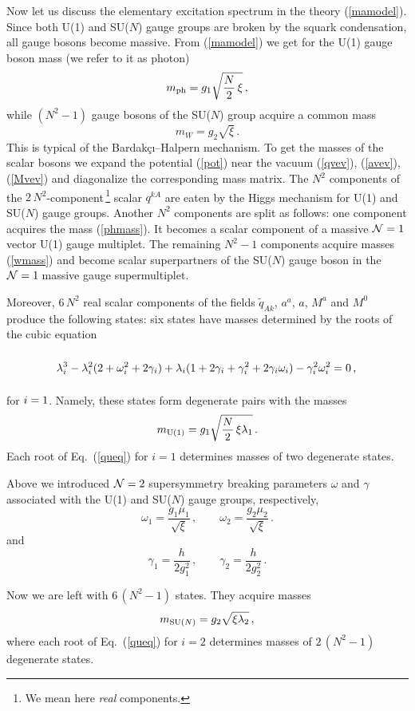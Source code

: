 \documentclass[epsfig,12pt]{article}
\def\beq{\begin{equation}}
\def\eeq{\end{equation}}
\newcommand{\ntwo}{${\cal N}=2\;$}
\newcommand{\none}{${\cal N}=1\;$}
\begin{document}
Now let us discuss the elementary excitation 
spectrum in the theory (\ref{mamodel}). Since
both U(1) and SU($N$) gauge groups are broken by the squark condensation,
all gauge bosons become massive. From (\ref{mamodel}) we get for the U(1)
gauge boson mass (we refer to it as photon)
\beq
m_{\rm ph}=g_1\sqrt{\frac{N}{2}\,\xi}\,,
\label{phmass}
\eeq
while   $(N^2-1)$ gauge bosons of the SU($N$) group acquire a common mass
\beq
m_{W}=g_2\sqrt{\xi}\,.
\label{wmass}
\eeq
This is typical of the Bardak\c{c}\i--Halpern mechanism.
To get the masses of the scalar bosons we expand the potential (\ref{pot})
near the vacuum (\ref{qvev}), (\ref{avev}), (\ref{Mvev}) and diagonalize the
corresponding mass matrix. The $N^2$ components of the
$2\,N^2$-component\,\footnote{We mean here  {\em real} components.}
scalar $q^{kA}$
are eaten by the Higgs mechanism for U(1) and SU($N$)
gauge groups. Another $N^2$ components are split as follows:
one component acquires the mass (\ref{phmass}). It becomes
 a scalar component of  a massive \none vector U(1) gauge multiplet.
The remaining $N^2-1$ components acquire masses (\ref{wmass}) and become
scalar superpartners of the SU($N$) gauge boson in the \none massive gauge
supermultiplet.

\vspace{2mm}

Moreover,  6$\,N^2$ real scalar components of the fields $\tilde{q}_{Ak}$, $a^a$, $a$,
$M^a$ and  $M^0$ produce the following states: 
six states have masses determined by the roots of the  cubic equation
\beq
\lambda_i^3-\lambda_i^2(2+\omega^2_i +2\gamma_i) +
\lambda_i(1 +2\gamma_i+\gamma^2_i +2\gamma_i\omega_i) -\gamma_i^2\omega_i^2=0\,,
\rule{0mm}{7mm}
\label{queq}
\eeq
for $i=1\rule{0mm}{7mm}$. Namely, these states form degenerate 
pairs with the masses 
\beq
m_{{\rm U}(1)}=g_1\sqrt{\frac{N}{2}\,\xi\lambda_1}\,.
\label{u1m}
\eeq
Each root of Eq.~(\ref{queq}) for $i=1$ determines masses
of two degenerate states.

Above we introduced  \ntwo supersymmetry breaking
parameters $\omega $ and $\gamma$
associated with the  U(1) and SU($N$) gauge groups, respectively,
\beq
\omega_1=\frac{g_1\mu_1}{\sqrt{\xi}}\, ,\qquad
\omega_2=\frac{g_2\mu_2}{\sqrt{\xi}}\,.
\label{omega}
\eeq
and 
\beq
\gamma_1=\frac{h}{2g^2_1}\, ,\qquad
\gamma_2=\frac{h}{2g^2_2}\,.
\label{gamma}
\eeq
\mbox{}
\vspace{2mm}
\mbox{}

Now we are left with $6\,(N^2-1)$ states.
They acquire masses
\beq
m_{{\rm SU}(N)}=g_2\sqrt{\xi\lambda_2}\,,
\label{suNm}
\eeq
where each root of Eq.~(\ref{queq}) for $i=2$ determines  masses
of $2\,(N^2-1)$ degenerate states.
\end{document}

